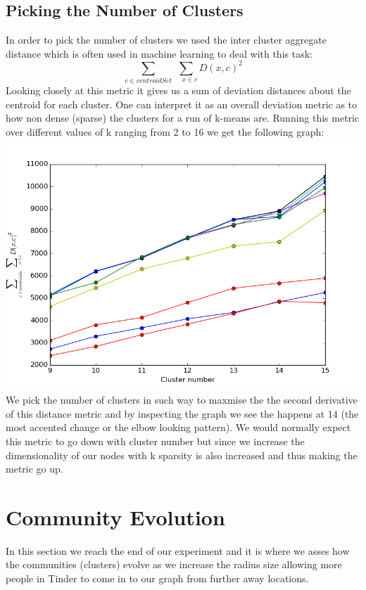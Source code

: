 \documentclass[10pt,twocolumn]{article}
\begin{document}
\subsection{Picking the Number of Clusters}
In order to pick the number of clusters we used
the inter cluster aggregate  distance which is often used in machine learning to deal with this task:
\[
\sum_{c \in centroidSet} \sum_{\quad x \in c} D(x, c)^{2}
\]
Looking closely at this metric it gives us a sum of deviation distances about the centroid for each cluster. One can interpret it as an overall deviation metric as to how non dense (sparse) the clusters for a run of k-means are. Running this metric over different values of k ranging from 2 to 16 we get the following graph:
\includegraphics[scale=0.4]{pics/m.png}
We pick the number of clusters in such way to maxmise the the second derivative of this distance metric and by inspecting the graph we see the happens at 14 (the most accented change or the elbow looking pattern). We would normally expect this metric to go down with cluster number but since we increase the dimensionality of our nodes with k sparsity is also increased and thus making the metric go up.

\section{Community Evolution}

In this section we reach the end of our experiment
and it is where we asses how the communities (clusters) evolve as we increase the radius size allowing more people in Tinder to come in to our graph from further away locations.
\end{document}
